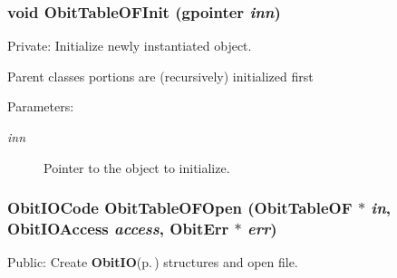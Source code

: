 \subsubsection{\setlength{\rightskip}{0pt plus 5cm}void Obit\-Table\-OFInit (gpointer {\em inn})}\label{ObitTableOF_8c_a8}


Private: Initialize newly instantiated object. 

Parent classes portions are (recursively) initialized first \begin{Desc}
\item[Parameters:]
\begin{description}
\item[{\em inn}]Pointer to the object to initialize. \end{description}
\end{Desc}
\subsubsection{\setlength{\rightskip}{0pt plus 5cm}Obit\-IOCode Obit\-Table\-OFOpen ({\bf Obit\-Table\-OF} $\ast$ {\em in}, Obit\-IOAccess {\em access}, {\bf Obit\-Err} $\ast$ {\em err})}\label{ObitTableOF_8c_a21}


Public: Create {\bf Obit\-IO}{\rm (p.\,\pageref{structObitIO})} structures and open file. 

